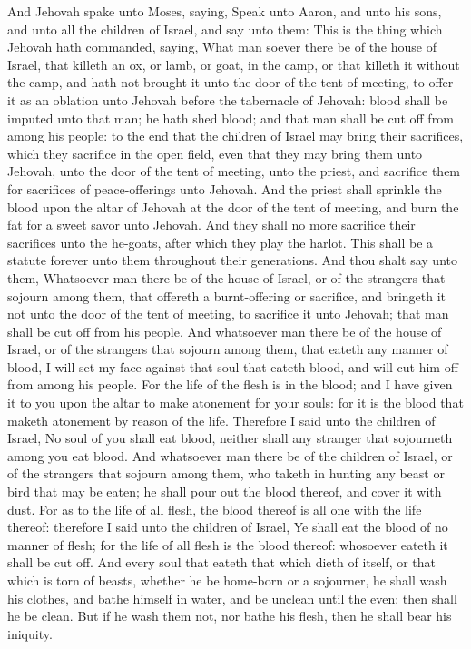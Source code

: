 And Jehovah spake unto Moses, saying, Speak unto Aaron, and unto his sons, and unto all the children of Israel, and say unto them: This is the thing which Jehovah hath commanded, saying, What man soever there be of the house of Israel, that killeth an ox, or lamb, or goat, in the camp, or that killeth it without the camp, and hath not brought it unto the door of the tent of meeting, to offer it as an oblation unto Jehovah before the tabernacle of Jehovah: blood shall be imputed unto that man; he hath shed blood; and that man shall be cut off from among his people: to the end that the children of Israel may bring their sacrifices, which they sacrifice in the open field, even that they may bring them unto Jehovah, unto the door of the tent of meeting, unto the priest, and sacrifice them for sacrifices of peace-offerings unto Jehovah. And the priest shall sprinkle the blood upon the altar of Jehovah at the door of the tent of meeting, and burn the fat for a sweet savor unto Jehovah. And they shall no more sacrifice their sacrifices unto the he-goats, after which they play the harlot. This shall be a statute forever unto them throughout their generations.  And thou shalt say unto them, Whatsoever man there be of the house of Israel, or of the strangers that sojourn among them, that offereth a burnt-offering or sacrifice, and bringeth it not unto the door of the tent of meeting, to sacrifice it unto Jehovah; that man shall be cut off from his people.  And whatsoever man there be of the house of Israel, or of the strangers that sojourn among them, that eateth any manner of blood, I will set my face against that soul that eateth blood, and will cut him off from among his people. For the life of the flesh is in the blood; and I have given it to you upon the altar to make atonement for your souls: for it is the blood that maketh atonement by reason of the life. Therefore I said unto the children of Israel, No soul of you shall eat blood, neither shall any stranger that sojourneth among you eat blood. And whatsoever man there be of the children of Israel, or of the strangers that sojourn among them, who taketh in hunting any beast or bird that may be eaten; he shall pour out the blood thereof, and cover it with dust.  For as to the life of all flesh, the blood thereof is all one with the life thereof: therefore I said unto the children of Israel, Ye shall eat the blood of no manner of flesh; for the life of all flesh is the blood thereof: whosoever eateth it shall be cut off. And every soul that eateth that which dieth of itself, or that which is torn of beasts, whether he be home-born or a sojourner, he shall wash his clothes, and bathe himself in water, and be unclean until the even: then shall he be clean. But if he wash them not, nor bathe his flesh, then he shall bear his iniquity. 

